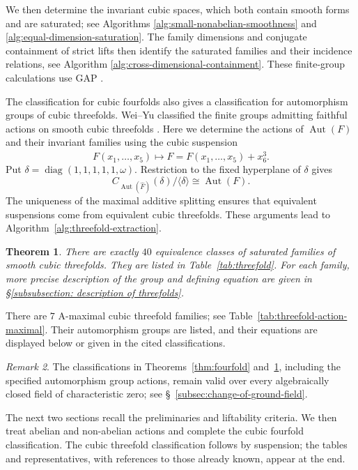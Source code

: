 \documentclass[12pt]{amsart}
\numberwithin{equation}{section}
\theoremstyle{plain}
\newtheorem{thm}{Theorem}[section]
\theoremstyle{definition}
\theoremstyle{remark}
\newtheorem{rmk}[thm]{Remark}
\DeclareMathOperator{\Aut}{Aut}
\DeclareMathOperator{\diag}{diag}
\begin{document}
We then determine the invariant cubic spaces, which both contain smooth forms and are saturated; see Algorithms \ref{alg:small-nonabelian-smoothness} and \ref{alg:equal-dimension-saturation}. The family dimensions and conjugate containment of strict lifts then identify the
saturated families and their incidence relations, see Algorithm \ref{alg:cross-dimensional-containment}.  These finite-group
calculations use GAP \cite{GAP4}.

The classification for cubic fourfolds also gives a classification for automorphism groups of
cubic threefolds.  Wei--Yu classified the finite groups admitting
faithful actions on smooth cubic threefolds \cite[Theorem~1.1]{LiYuThreefold}.
Here we determine the actions of $\Aut(F)$ and their invariant families
using the cubic suspension
\[
F(x_1,\ldots,x_5)\longmapsto
\widehat F=F(x_1,\ldots,x_5)+x_6^3.
\]
Put $\delta=\diag(1,1,1,1,1,\omega)$.  Restriction to the fixed
hyperplane of $\delta$ gives
\[
C_{\Aut(\widehat F)}(\delta)/\langle\delta\rangle
\cong\Aut(F).
\]
The uniqueness of the maximal additive splitting
\cite{harrison1975higherdegreeforms} ensures that equivalent suspensions come from equivalent cubic threefolds. These arguments lead to Algorithm~\ref{alg:threefold-extraction}.

\begin{thm}\label{thm:threefold}
There are exactly $40$ equivalence classes of saturated families of
smooth cubic threefolds. They are listed in Table~\ref{tab:threefold}. For each family, more precise description of the group and defining equation are given in \S\ref{subsubsection: description of threefolds}.
\end{thm}

There are $7$ A-maximal cubic threefold families; see
Table~\ref{tab:threefold-action-maximal}.  Their automorphism groups are
listed, and their equations are displayed below or given in the cited
classifications.

\begin{rmk}\label{rmk:characteristic-zero}
The classifications in Theorems~\ref{thm:fourfold} and~\ref{thm:threefold},
including the specified automorphism group actions, remain valid over
every algebraically closed field of characteristic zero; see
\S~\ref{subsec:change-of-ground-field}.
\end{rmk}

The next two sections recall the preliminaries and liftability criteria.
We then treat abelian and non-abelian actions and complete the cubic fourfold
classification.  The cubic threefold classification follows by suspension;
the tables and representatives, with references to those already known,
appear at the end.
\end{document}
